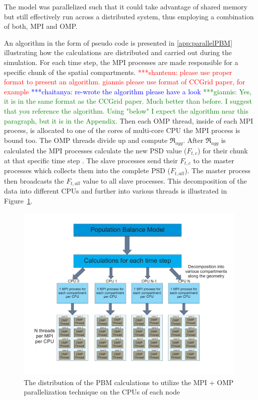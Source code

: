 \documentclass[preprint,11pt,authoryear]{elsarticle}
\newcommand{\jhanote}[1]{ {\textcolor{red} { ***shantenu: #1 }}}
\newcommand{\csnote}[1]{ {\textcolor{blue} { ***chaitanya: #1 }}}
\newcommand{\gpnote}[1]{{\textcolor{green} {***giannis: #1}}}
\newcommand{\jhanote}[1]{ {\textcolor{red} { ***shantenu: #1 }}}
\newcommand{\csnote}[1]{}
\newcommand{\gpnote}[1]{}
\begin{document}
The model was parallelized such that it
could take advantage of shared memory but still effectively run across a
distributed system, thus employing a combination of both, MPI and OMP.

An algorithm in the form of pseudo code is presented in \ref{app:parallelPBM} illustrating how
the calculations are distributed and carried out during the simulation. For
each time step, the MPI processes are made responsible for a specific chunk of
the spatial compartments. 
\jhanote{please use proper format to present an
algorithm. giannis please use format of CCGrid paper, for example} \csnote{re-wrote the algorithm please have a look}
\gpnote{Yes, it is in the same format as the CCGrid paper. Much better than before. I suggest that you reference the algorithm. Using "below" I expect the algorithm near this paragraph, but it is in the Appendix.} Then each OMP thread, inside of each MPI process, is allocated to one of the cores of
multi-core CPU the MPI process is bound too. The OMP threads divide up and
compute $\Re_{agg}$. After $\Re_{agg}$ is calculated the MPI processes
calculate the new PSD value ($F_{t,c}$) for their chunk at that specific time step
. The slave processes send their $F_{t,c}$ to the master processes
which collects them into the complete PSD ($F_{t,all}$). The master process then
broadcasts the $F_{t,all}$ value to all slave processes. This decomposition of
the data into different CPUs and further into various threads is illustrated
in Figure~\ref{fig:mthds_PBM_decompostion}.

\begin{figure}
\centering
\includegraphics[scale=0.45]{PBM_decomposition.pdf}
\caption{The distribution of the PBM calculations to utilize the MPI + OMP parallelization technique on the CPUs of each node}
\label{fig:mthds_PBM_decompostion}
\end{figure}
\end{document}

